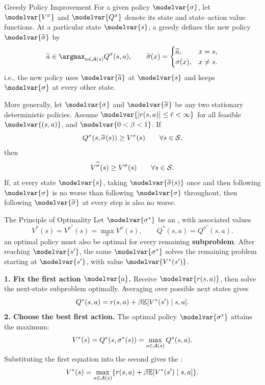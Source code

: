 \begin{frame}{Greedy Policy Improvement}
\small
\setlength{\abovedisplayskip}{4pt}
\setlength{\belowdisplayskip}{4pt}
For a given policy \(\modelvar{\sigma}\), let \(\modelvar{V^\sigma}\) and \(\modelvar{Q^\sigma}\) denote its state and state--action value functions. At a particular state \(\modelvar{s}\), a greedy  defines the new policy \(\modelvar{\widetilde\sigma}\) by
\[
\widetilde a\in\argmax_{a\in\Aset(s)}Q^\sigma(s,a),
\qquad
\widetilde\sigma(x)=
\begin{cases}
\widetilde a,&x=s,\\
\sigma(x),&x\neq s.
\end{cases}
\]
i.e., the new policy uses \(\modelvar{\widetilde a}\) at \(\modelvar{s}\) and keeps \(\modelvar{\sigma}\) at every other state.
\par\medskip
{} More generally, let \(\modelvar{\sigma}\) and \(\modelvar{\widetilde\sigma}\) be any two stationary deterministic policies. Assume \(\modelvar{|r(s,a)|\leq\bar r<\infty}\) for all feasible \(\modelvar{(s,a)}\), and \(\modelvar{0<\beta<1}\). If
\[Q^\sigma(s,\widetilde\sigma(s))\geq V^\sigma(s)\qquad\forall s\in\mathcal S,\]
then
\[V^{\widetilde\sigma}(s)\geq V^\sigma(s)\qquad\forall s\in\mathcal S.\]
If, at every state \(\modelvar{s}\), taking \(\modelvar{\widetilde\sigma(s)}\) once and then following \(\modelvar{\sigma}\) is no worse than following \(\modelvar{\sigma}\) throughout, then following \(\modelvar{\widetilde\sigma}\) at every step is also no worse.
\end{frame}

\begin{frame}{The Principle of Optimality}
\small
\setlength{\abovedisplayskip}{3pt}
\setlength{\belowdisplayskip}{3pt}
Let \(\modelvar{\sigma^*}\) be an , with associated values
\[V^*(s)=V^{\sigma^*}(s)=\max_\sigma V^\sigma(s),\qquad
Q^*(s,a)=Q^{\sigma^*}(s,a).\]
 an optimal policy must also be optimal for every remaining \textbf{subproblem}. After reaching \(\modelvar{s'}\), the same \(\modelvar{\sigma^*}\) solves the remaining problem starting at \(\modelvar{s'}\), with value \(\modelvar{V^*(s')}\).
\par\smallskip
\textbf{1. Fix the first action \(\modelvar{a}\).} Receive \(\modelvar{r(s,a)}\), then solve the next-state subproblem optimally. Averaging over possible next states gives
\[Q^*(s,a)=r(s,a)+\beta\mathbb E[V^*(s')\mid s,a].\]
\textbf{2. Choose the best first action.} The optimal policy \(\modelvar{\sigma^*}\) attains the maximum:
\[V^*(s)=Q^*(s,\sigma^*(s))=\max_{a\in\mathcal A(s)}Q^*(s,a).\]
Substituting the first equation into the second gives the :
\[V^*(s)=\max_{a\in\mathcal A(s)}\{r(s,a)+\beta\mathbb E[V^*(s')\mid s,a]\}.\]
\end{frame}

